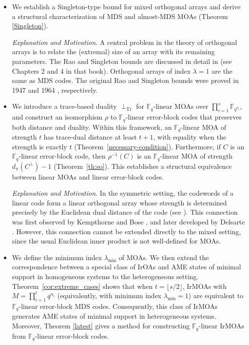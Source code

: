 \documentclass[11pt]{article}
\newtheorem{Definition and Notation}[Theorem]{Definition and Notation}
\begin{document}
\begin{itemize}
    \item We establish a Singleton-type bound for mixed orthogonal arrays and derive a structural characterization of MDS and almost-MDS MOAs (Theorem \ref{Singleton}). 

{\it Explanation and Motivation}. A central problem in the theory of orthogonal arrays is to relate the (extremal) size of an array with its remaining parameters. The Rao and Singleton bounds are discussed in detail in \cite{HSS2012} (see Chapters 2 and 4 in that book). Orthogonal arrays of index $\lambda=1$ are the same as MDS codes. The original Rao and Singleton bounds were proved in 1947 \cite{Rao1947} and 1964 \cite{Singleton1964}, respectively. 

    \item We introduce a trace-based duality $\perp_{\mathrm{Tr}}$ for $\mathbb{F}_q$-linear MOAs over $\prod_{i=1}^{s}\mathbb{F}_{q^{n_i}}$, and construct an isomorphism $\rho$ to $\mathbb{F}_q$-linear error-block codes that preserves both distance and duality. Within this framework, an $\mathbb{F}_q$-linear MOA of strength $t$ has trace-dual distance at least $t+1$, with equality when the strength is exactly $t$ (Theorem~\ref{necessary-condition}). Furthermore, if $C$ is an $\mathbb{F}_q$-linear error-block code, then $\rho^{-1}(C)$ is an $\mathbb{F}_q$-linear MOA of strength $d_\pi(C^\perp)-1$ (Theorem~\ref{th:so}). This establishes a structural equivalence between linear MOAs and linear error-block codes.

{\it Explanation and Motivation}. In the symmetric setting, the codewords of a linear code form a linear orthogonal array whose strength is determined precisely by the Euclidean dual distance of the code (see \cite[Theorem~4.6]{HSS2012}). This connection was first observed by Kempthorne \cite{Kempthorne1947} and Bose \cite{Bose1961}, and later developed by Delsarte \cite{Delsarte1973}. However, this connection cannot be extended directly to the mixed setting, since the usual Euclidean inner product is not well-defined for MOAs.
    

    \item We define the minimum index $\lambda_{\min}$ of MOAs. We then extend the correspondence between a special class of IrOAs and AME states of minimal support in homogeneous systems to the heterogeneous setting. Theorem~\ref{cor:extreme_cases} shows that when $t=\lfloor s/2\rfloor$, IrMOAs with $M=\prod_{i=1}^{t} q^{n_i}$ (equivalently, with minimum index $\lambda_{\min}=1$) are equivalent to $\mathbb{F}_q$-linear error-block MDS codes. Consequently, this class of IrMOAs generates AME states of minimal support in heterogeneous systems. Moreover, Theorem \ref{latest} gives a method for constructing $\mathbb{F}_q$-linear IrMOAs from $\mathbb{F}_q$-linear error-block codes.
    

\end{itemize}
\end{document}
